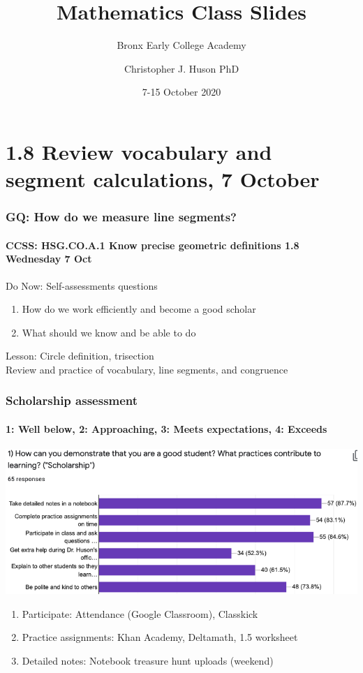 \documentclass{beamer}
\title{Mathematics Class Slides}
\subtitle{Bronx Early College Academy}
\author{Christopher J. Huson PhD}
\date{7-15 October 2020}
\begin{document}
\frame{\titlepage}
\section[Outline]{}
\frame{\tableofcontents}

\section{1.8 Review vocabulary and segment calculations, 7 October}
  \frame
  {
    \frametitle{GQ: How do we measure line segments?}
    \framesubtitle{CCSS: HSG.CO.A.1 Know precise geometric definitions  \hfill \alert{1.8 Wednesday 7 Oct}}
  
    \begin{block}{Do Now: Self-assessments questions}
    \begin{enumerate}
        \item How do we work efficiently and become a good scholar
        \item What should we know and be able to do
    \end{enumerate}
    \end{block}
    Lesson: Circle definition, trisection \\
    Review and practice of vocabulary, line segments, and congruence
  }

  \frame
  {
    \frametitle{Scholarship assessment}
    \framesubtitle{1: Well below, 2: Approaching, 3: Meets expectations, 4: Exceeds}
  \includegraphics[width=.95\textwidth]{scholarship-bar-chart.png}
    \begin{enumerate}
      \item Participate: Attendance (Google Classroom), Classkick
      \item Practice assignments: Khan Academy, Deltamath, 1.5 worksheet
      \item Detailed notes: Notebook treasure hunt uploads (weekend)
    \end{enumerate}
  }
\end{document}
